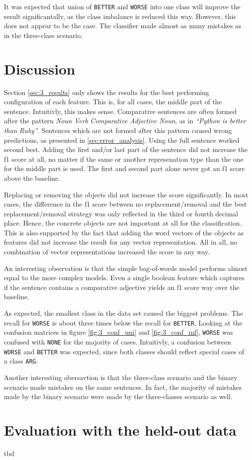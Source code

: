 It was expected that union of \texttt{BETTER} and \texttt{WORSE} into one class will improve the result significantally, as the class imbalance is reduced this way. However, this does not appear to be the case. The classifier made almost as many mistakes as in the three-class scenario.

\FloatBarrier
\section{Discussion}
Section \ref{sec:3_results} only shows the results for the best performing configuration of each feature. This is, for all cases, the middle part of the sentence. Intuitivly, this makes sense. Comparative sentences are often formed after the pattern \emph{Noun Verb Comparative Adjective Noun}, as in \emph{\enquote{Python is better than Ruby}}. Sentences which are not formed after this pattern caused wrong predictions, as presented in \ref{sec:error_analysis}.
 Using the full sentence worked second best. Adding the first and/or last part of the sentence did not increase the f1 score at all, no matter if the same or another represenation type than the one for the middle part is used. The first and second part alone never got an f1 score above the baseline.

Replacing or removing the objects did not increase the score significantly. In most cases, the difference in the f1 score between no replacement/removal and the best replacement/removal strategy was only reflected in the third or fourth decimal place. Hence, the concrete objects are not important at all for the classification. This is also supported by the fact that adding the word vectors of the objects as features did not increase the result for any vector representation. All in all, no combination of vector representations increased the score in any way.

An interesting observation is that the simple bag-of-words model performs almost equal to the more complex models. Even a single boolean feature which captures if the sentence contains a comparative adjective yields an f1 score way over the baseline.

As expected, the smallest class in the data set caused the biggest problems. The recall for \texttt{WORSE} is about three times below the recall for \texttt{BETTER}. Looking at the confusion matrices in figure \ref{fig:3_conf_uni} and \ref{fig:3_conf_inf}, \texttt{WORSE} was confused with \texttt{NONE} for the majority of cases. Intuitivly, a confusion between \texttt{WORSE} and \texttt{BETTER} was expected, since both classes should reflect special cases of a class \texttt{ARG}.

Another interesting obersavtion is that the three-class scenario and the binary scenario made mistakes on the same sentences. In fact, the majority of mistakes made by the binary scenario were made by the three-classes scenario as well.


\section{Evaluation with the held-out data}
tbd
\label{sec:final}

